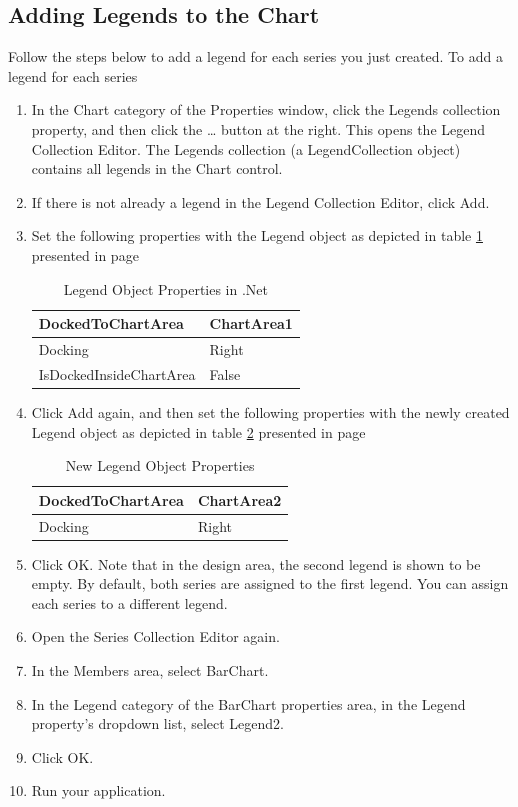 \documentclass[12pt,a4paper,final,twoside,titlepage]{book}
\begin{document}
\subsection{Adding Legends to the Chart}
Follow the steps below to add a legend for each series you just created.
To add a legend for each series
\begin{enumerate}
\item In the Chart category of the Properties window, click the Legends collection property, and then click the … button at the right. This opens the Legend Collection Editor.
The Legends collection (a LegendCollection object) contains all legends in the Chart control.
\item If there is not already a legend in the Legend Collection Editor, click Add.
\item Set the following properties with the Legend object as depicted in table \ref{LegendObjectProperties} presented in page \pageref{LegendObjectProperties}
\begin{table}
\begin{center}
\caption{Legend Object Properties in .Net}
\begin{tabular}{|l|l|}
\hline
DockedToChartArea & ChartArea1 \\ \hline
Docking & Right \\ \hline
IsDockedInsideChartArea & False\\ \hline
\end{tabular}
\end{center}
\label{LegendObjectProperties}
\end{table}
\item Click Add again, and then set the following properties with the newly created Legend object as depicted in table \ref{NewLegendObjectProperties} presented in page \pageref{NewLegendObjectProperties}
\begin{table}
\caption{New Legend Object Properties}
\label{NewLegendObjectProperties}
\begin{center}
\begin{tabular}{|l|l|}
\hline
DockedToChartArea & ChartArea2 \\ \hline
Docking & Right \\ \hline
\end{tabular}
\end{center}
\end{table}
\item Click OK.
Note that in the design area, the second legend is shown to be empty. By default, both series are assigned to the first legend. You can assign each series to a different legend.
\item Open the Series Collection Editor again.
\item In the Members area, select BarChart.
\item In the Legend category of the BarChart properties area, in the Legend property's dropdown list, select Legend2.
\item Click OK.
\item Run your application.
\end{enumerate}
\end{document}
